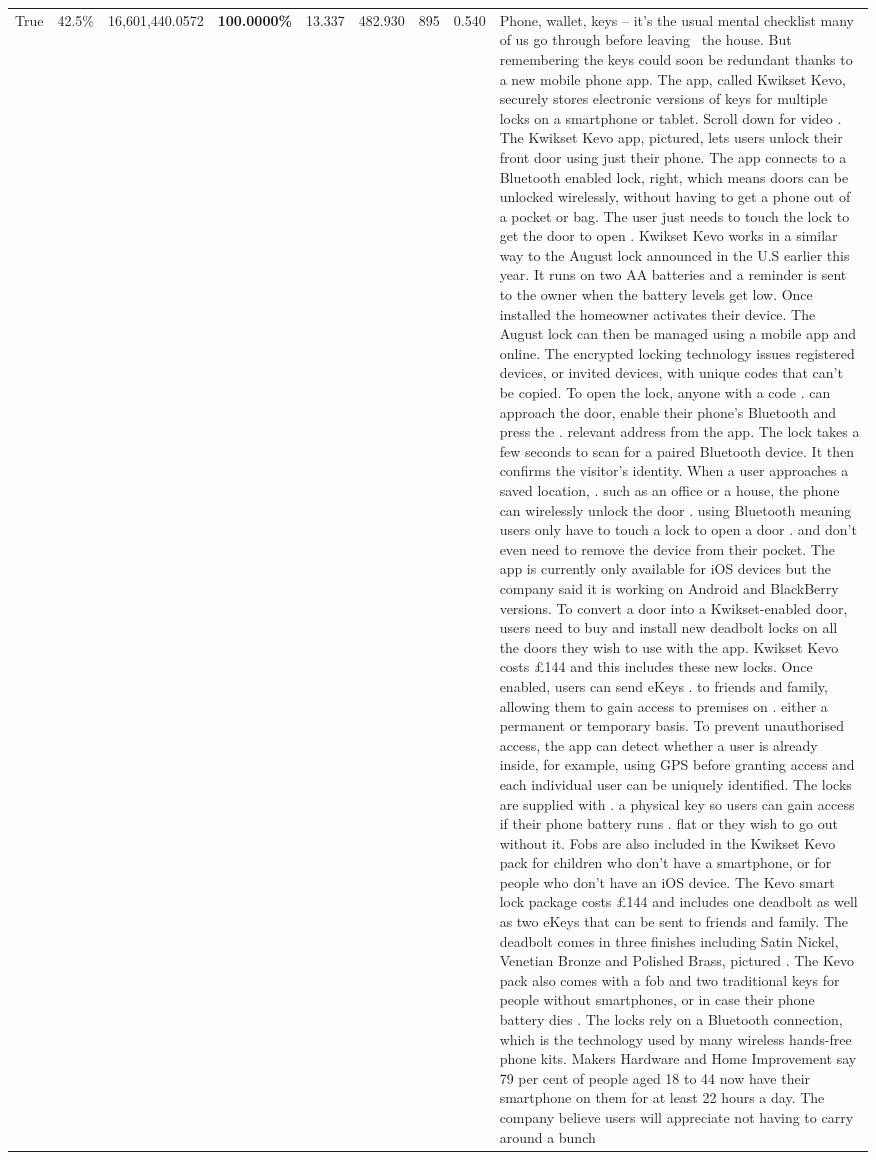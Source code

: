 \begin{table}[H]
\begin{tabular}{lllrlllll}
True & 42.5\% & 16,601,440.0572 & \bfseries \color{red} 100.0000\% & 13.337 & 482.930 & 895 & 0.540 & Phone, wallet, keys – it’s the usual mental checklist many of us go through before leaving  the house. But remembering the keys could soon be redundant thanks to a new mobile phone app. The app, called Kwikset Kevo, securely stores electronic versions of keys for multiple locks on a smartphone or tablet. Scroll down for video . The Kwikset Kevo app, pictured, lets users unlock their front door using just their phone. The app connects to a Bluetooth enabled lock, right, which means doors can be unlocked wirelessly, without having to get a phone out of a pocket or bag. The user just needs to touch the lock to get the door to open . Kwikset Kevo works in a similar way to the August lock announced in the U.S earlier this year. It runs on two AA batteries and a reminder is sent to the owner when the battery levels get low. Once installed the homeowner activates their device. The August lock can then be managed using a mobile app and online. The encrypted locking technology issues registered devices, or invited devices, with unique codes that can't be copied. To open the lock, anyone with a code . can approach the door, enable their phone's Bluetooth and press the . relevant address from the app. The lock takes a few seconds to scan for a paired Bluetooth device. It then confirms the visitor's identity. When a user approaches a saved location, . such as an office or a house, the phone can wirelessly unlock the door . using Bluetooth meaning users only have to touch a lock to open a door . and don't even need to remove the device from their pocket. The app is currently only available for iOS devices but the company said it is working on Android and BlackBerry versions. To convert a door into a Kwikset-enabled door, users need to buy and install new deadbolt locks on all the doors they wish to use with the app. Kwikset Kevo costs £144 and this includes these new locks. Once enabled, users can send eKeys . to friends and family, allowing them to gain access to premises on . either a permanent or temporary basis. To prevent unauthorised access, the app can detect whether a user is already inside, for example, using GPS before granting access and each individual user can be uniquely identified. The locks are supplied with . a physical key so users can gain access if their phone battery runs . flat or they wish to go out without it. Fobs are also included in the Kwikset Kevo pack for children who don't have a smartphone, or for people who don't have an iOS device. The Kevo smart lock package costs £144 and includes one deadbolt as well as two eKeys that can be sent to friends and family. The deadbolt comes in three finishes including Satin Nickel, Venetian Bronze and Polished Brass, pictured . The Kevo pack also comes with a fob and two traditional keys for people without smartphones, or in case their phone battery dies . The locks rely on a Bluetooth connection, which is the technology used by many wireless hands-free phone kits. Makers Hardware and Home Improvement say 79 per cent of people aged 18 to 44 now have their smartphone on them for at least 22 hours a day. The company believe users will appreciate not having to carry around a bunch 
\end{tabular}
\end{table}
